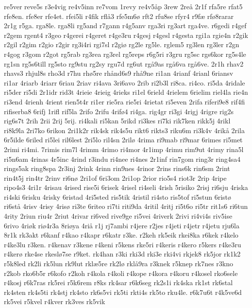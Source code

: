 {re5ver
reve5s
r3e4vig
re4v5inn
re7vom
1revy
re4v5åp
3rew
2reå
2r1f
rfa5re
rfat5
rfe8en.
rfe8er
rfe4et.
rfei5li
r4fik
rflå3
rfe5m6ø
rft2
rfu8se
rfyr4
r9fæ
rfø8rarar
2r1g
r5ga.
rga8le.
rga8li
rg5and
r7gann
r4g5anv
rga3ri
rg3art
rga4ve.
r6gedi
r4gef
r2gem
rgent4
r3geo
r4gerei
r4geret
r4ge3ru
r4gesj
r4gesl
r4gesta
rgi1a
rgie4n
r2gik
r2gil
r2gim
r2gio
r2gir
rg3i4ri
rgi7sl
r2giø
rg2le
rg5le.
rglem5
rg3len
rg3ler
r2gn
r4gog
r3gom
r2got
rg5rab
rg3rea
rg3rel
rg5reps
r6g5ri
r3gru
rg5sc
rgs6kor
rg5s4le
rg1sn
rg5s6till
rg5sto
rg9stu
rg2sy
rgu7d
rg6ut
rgå9as
rgå6va
rgå6ve.
2r1h
rhav2
rhavs3
rhjul8s
rho3d
r7hu
rhø5re
rhånd6s9
rhå9ne
ri1an
4rianf
4rianl
6riansv
ri1ar
4riarb
4riarr
6riau
2riav
ri4ava
3ri6avo
2rib
ri2b3l
ri8ca.
ri4co.
ri5da
4ridale
ri5der
ri5di
2r1idr
rid3t
4rieie
4rieig
4rieks
ri1el
6rield
4rielem
6rielim
riel4la
rie4n
ri3end
4rienh
4rient
rien5t4r
ri1er
rie5ra
rie5ri
4rietat
ri5even
2rifa
riferi9e8
rif4fi
rifiserba8
6rifj
1rifl
rif5la
2rifo
2rifu
4rifø4
ri4ga.
rig4gr
ri3gi
4rigj
4rigre
rig2s
rig6s7t
2rih
2rii
2rij
5rij.
ri4kali
ri5kan
5rikd
ri3kes
ri7ki
rik7ken
rikk5j
4rikl
ri8k9la
2ri7ko
6rikon
2ri1k2r
rik4sk
rik4s5u
rikt6
rikts3
riku6m
ri3k4v
4rikå
2rila
6r5ilde
6riled
ri5lei
ril6lest
2ri5lo
ril4sn
2rilø
4rima
ri9mab
ri9mar
6rimes
ri5met
2rimi
ri4mi.
7rimis
rim7l
4rimm
4rimo
ri4mor
4r1imp
4rimu
rim9ut
4rimy
rina5l
ri5n6am
4rinas
4r5inc
4rind
r3indu
ri4nee
ri4nes
2r1inf
rin7gom
ring3r
ring4sa4
rings5ak
ring8spa
2r3inj
2rink
4rinn
rin9nes
4rinor
2rins
rins6k
rin6sm
2rint
rin4t5j
rin4tr
2rinv
ri6nø
2ri1of
6ri3om
2ri1op
2rior
rio5s4
riot3r
2rip
4ripe
ripo4s3
4ri1r
4risau
4rised
rise5i
6risek
4risel
ri4seli
4rish
5risiko
2risj
ri6sju
4riska
ri4ski
6risku
4risky
6ristad
4ri5sted
ris5tik
4ristil
ri4sto
ris5tof
ri5stun
6ristø
ri6stå
4risv
4risy
4risø
ri3te
6riteo
ri7ti
riti9da
4ritil
4ritj
ri5t6o
ri5tr
rit1s6
ri6tun
4rity
2riun
riu4r
2riut
4rivar
ri6ved
rive9ge
ri5vei
4riverk
2rivi
ri4vi4s
riv5ise
6rivo
4riøk
riø4r3a
8riøya
4riå
r1j
rj7ambi
r4jere
r2jes
r4jeti
r4jetr
r4jetu
rju6la
8r1k
rk3akt
r6kanf
r4kao
r4kapr
r6katr
r3ke.
r2keh
rk5eik
rkei8ka
r6kek
r4kelo
r4ke3lu
r3ken.
r4kenav
r3kene
r4keni
r5kens
rke5ri
r4keris
r4kero
r5kers
r4ke3ru
r4kerø
rke4se
rkeslø7se
r9ket.
rk4han
r3ki
rki3d
rki3e
rki4vi
rkjek8
rk5jor
rk1k2
r5k8led
rk2li
rk5lun
rk9lut
rklæ5re
rk2lø
rklå9ra
r3knek
r5knep
rk7nes
r3kno
r2kob
rko6b5r
r6kofo
r2koh
r4kola
r4koli
r4kope
r4kora
r4koru
r4kosel
rko6sele
r4kosj
r6k7ras
rk5rei
r5k6rem
r8ks
rk4sar
r6k6seg
rk2s1i
rk4ska
rk1st
rk6stal
rk4sten
rk4s5ti
rk4stj
rk4sto
rk6s5vi
rk5ti
rkti4s
rk5to
rku4le.
r6k7u6t
r4k5ve6d
rk5vei
r5kvel
r4kver
rk3ves
rk5vik
}
